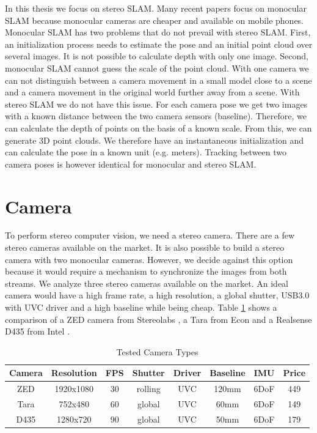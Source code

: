 \documentclass[11pt,a4paper,titlepage,oneside]{report}
\begin{document}
In this thesis we focus on stereo SLAM. Many recent papers focus on monocular SLAM because monocular cameras are cheaper and available on mobile phones. Monocular SLAM has two problems that do not prevail with stereo SLAM. First, an initialization process needs to estimate the pose and an initial point cloud over several images. It is not possible to calculate depth with only one image. Second, monocular SLAM cannot guess the scale of the point cloud. With one camera we can not distinguish between a camera movement in a small model close to a scene and a camera movement in the original world further away from a scene. With stereo SLAM we do not have this issue. For each camera pose we get two images with a known distance between the two camera sensors (baseline). Therefore, we can calculate the depth of points on the basis of a known scale. From this, we can generate 3D point clouds. We therefore have an instantaneous initialization and can calculate the pose in a known unit (e.g. meters). Tracking between two camera poses is however identical for monocular and stereo SLAM.

\section{Camera}

To perform stereo computer vision, we need a stereo camera. There are a few stereo cameras available on the market. It is also possible to build a stereo camera with two monocular cameras. However, we decide against this option because it would require a mechanism to synchronize the images from both streams. We analyze three stereo cameras available on the market. An ideal camera would have a high frame rate, a high resolution, a global shutter, USB3.0 with UVC driver and a high baseline while being cheap. Table \ref{tab:cameras} shows a comparison of a ZED camera from Stereolabs \cite{zed}, a Tara from Econ \cite{tara} and a Realsense D435 from Intel \cite{realsense}.

\tiny
\begin{table}[H]
  \centering
  \begin{tabular}{|c|c|c|c|c|c|c|c|}
  Camera & Resolution & FPS & Shutter & Driver & Baseline & IMU & Price \\
  \hline
  ZED & 1920x1080 & 30 & rolling &  UVC & 120mm & 6DoF & 449\\
  Tara & 752x480& 60 & global &  UVC &  60mm & 6DoF & 149\\
  D435 & 1280x720& 90 & global & UVC &  50mm & 6DoF & 179\\
\end{tabular}
\caption{Tested Camera Types}
\label{tab:cameras}
\end{table}
\normalsize
\end{document}
